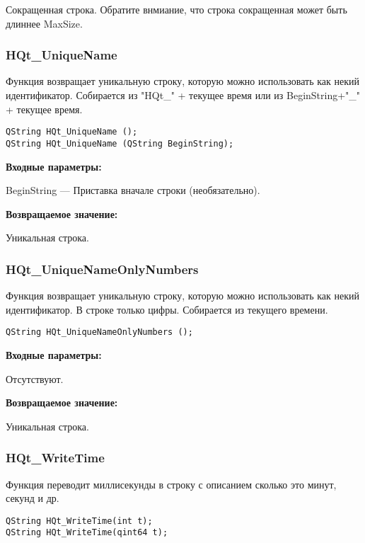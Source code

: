 \documentclass[a4paper,12pt]{article}
\begin{document}
Сокращенная строка. Обратите внмиание, что строка сокращенная может быть длиннее MaxSize.


\subsubsection{HQt\_UniqueName}\label{HQt_UniqueName}

Функция возвращает уникальную строку, которую можно использовать как некий идентификатор. Собирается из "HQt\_" + текущее время или из BeginString+"\_" + текущее время.


\begin{lstlisting}[label=code_syntax_HQt_UniqueName,caption=Синтаксис]
QString HQt_UniqueName ();
QString HQt_UniqueName (QString BeginString);
\end{lstlisting}

\textbf{Входные параметры:}

BeginString --- Приставка вначале строки (необязательно).

\textbf{Возвращаемое значение:}

Уникальная строка.


\subsubsection{HQt\_UniqueNameOnlyNumbers}\label{HQt_UniqueNameOnlyNumbers}

Функция возвращает уникальную строку, которую можно использовать как некий идентификатор. В строке только цифры. Собирается из текущего времени.


\begin{lstlisting}[label=code_syntax_HQt_UniqueNameOnlyNumbers,caption=Синтаксис]
QString HQt_UniqueNameOnlyNumbers ();
\end{lstlisting}

\textbf{Входные параметры:}

Отсутствуют.

\textbf{Возвращаемое значение:}

Уникальная строка.


\subsubsection{HQt\_WriteTime}\label{HQt_WriteTime}

Функция переводит миллисекунды в строку с описанием сколько это минут, секунд и др.


\begin{lstlisting}[label=code_syntax_HQt_WriteTime,caption=Синтаксис]
QString HQt_WriteTime(int t);
QString HQt_WriteTime(qint64 t);
\end{lstlisting}
\end{document}
